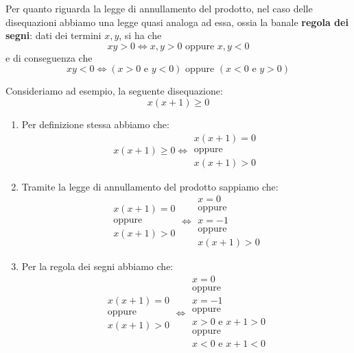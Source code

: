 \documentclass[a4paper, 12pt]{report}
\begin{document}
    Per quanto riguarda la legge di annullamento del prodotto, nel caso delle disequazioni abbiamo una legge quasi analoga ad essa, ossia la banale \textbf{regola dei segni}: dati dei termini $x, y$, si ha che
    \[xy > 0 \iff x,y > 0 \text{ oppure } x,y < 0\]
    e di conseguenza che
    \[xy < 0 \iff (x > 0 \text{ e } y < 0) \text{ oppure } (x < 0 \text{ e } y > 0)\]
    
    Consideriamo ad esempio, la seguente disequazione:
    \[x(x+1) \geq 0\]
    
    \begin{enumerate}
        \item Per definizione stessa abbiamo che:
        \[x(x+1) \geq 0 \iff \begin{array}{c}
            x(x+1) = 0 \\
            \text{oppure} \\
            x(x+1) > 0
        \end{array}\]

        \item Tramite la legge di annullamento del prodotto sappiamo che:
        \[\begin{array}{c}
            x(x+1) = 0 \\
            \text{oppure} \\
            x(x+1) > 0
        \end{array}
        \iff \begin{array}{c}
            x = 0 \\
            \text{oppure} \\
            x = -1 \\
            \text{oppure} \\
            x(x+1) > 0
        \end{array}\]

        \item Per la regola dei segni abbiamo che:
        \[\begin{array}{c}
            x(x+1) = 0 \\
            \text{oppure} \\
            x(x+1) > 0
        \end{array}
        \iff \begin{array}{c}
            x = 0 \\
            \text{oppure} \\
            x = -1 \\
            \text{oppure} \\
            x > 0 \text{ e } x+1 > 0\\
            \text{oppure} \\
            x < 0 \text{ e } x+1 < 0\\
        \end{array}\]


\end{enumerate}
\end{document}
